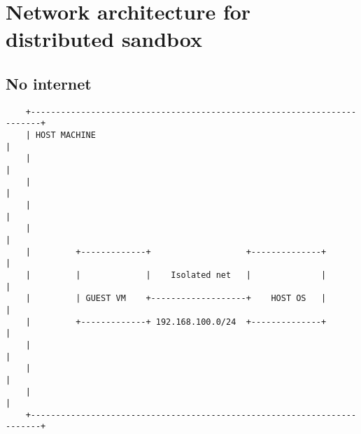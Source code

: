 \chapter{Network architecture for distributed sandbox} \label{app:network}
\section{No internet}
\begin{verbatim}
    +------------------------------------------------------------------------+
    | HOST MACHINE                                                           |
    |                                                                        |
    |                                                                        |
    |                                                                        |
    |                                                                        |
    |         +-------------+                   +--------------+             |
    |         |             |    Isolated net   |              |             |
    |         | GUEST VM    +-------------------+    HOST OS   |             |
    |         +-------------+ 192.168.100.0/24  +--------------+             |
    |                                                                        |
    |                                                                        |
    |                                                                        |
    +------------------------------------------------------------------------+
\end{verbatim}

\newpage

